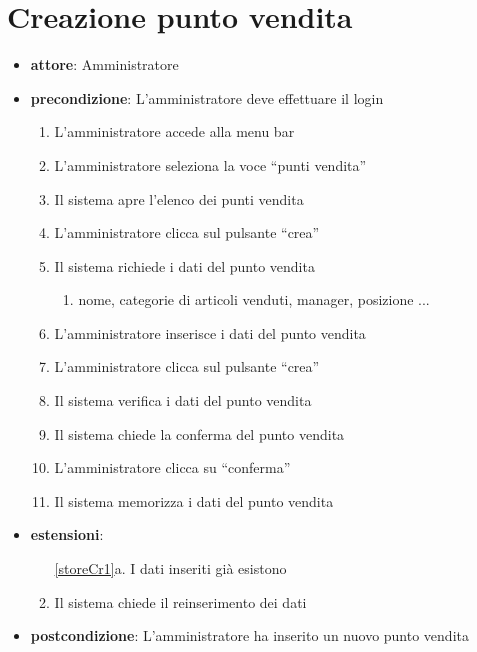 \section{Creazione punto vendita}
\begin{itemize}
	\item \textbf{attore}: Amministratore
	\item \textbf{precondizione}: L’amministratore deve effettuare il login
	
	\begin{enumerate}
		\item L’amministratore accede alla menu bar
		\item L’amministratore seleziona la voce “punti vendita”
		\item Il sistema apre l’elenco dei punti vendita
		\item L’amministratore clicca sul pulsante “crea”
		\item Il sistema richiede i dati del punto vendita
		\begin{enumerate}
			\item nome, categorie di articoli venduti, manager, posizione ...
		\end{enumerate}
		\item L’amministratore inserisce i dati del punto vendita
		\item L’amministratore clicca sul pulsante “crea”
		\item Il sistema verifica i dati del punto vendita
		\label{storeCr1}
		\item Il sistema chiede la conferma del punto vendita
		\item L’amministratore clicca su “conferma”
		\item Il sistema memorizza i dati del punto vendita
	\end{enumerate}

	\item \textbf{estensioni}:
	\begin{enumerate}
		\item[\ref{storeCr1}a.] I dati inseriti già esistono 
		\item Il sistema chiede il reinserimento dei dati
	\end{enumerate}

	\item \textbf{postcondizione}: L’amministratore ha inserito un nuovo punto vendita
\end{itemize}


